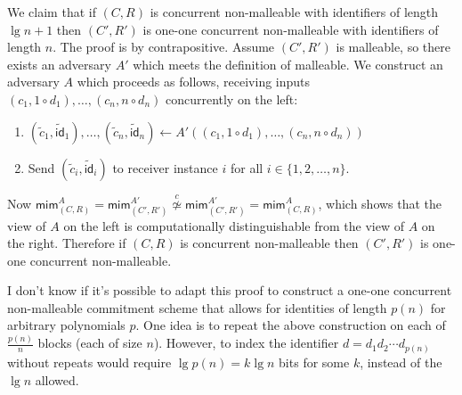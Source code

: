 \documentclass[draft]{article}
\newcommand{\ncid}{\overset{c}{\not\simeq}}
\newcommand{\mim}{\mathsf{mim}}
\begin{document}
\begin{enumerate}
  We claim that if $(C, R)$ is concurrent non-malleable with identifiers of length $\lg n + 1$ then $(C', R')$ is one-one concurrent non-malleable with identifiers of length $n$.
  The proof is by contrapositive.
  Assume $(C', R')$ is malleable, so there exists an adversary $A'$ which meets the definition of malleable.
  We construct an adversary $A$ which proceeds as follows, receiving inputs $(c_1, 1\circ d_1), \ldots, (c_n, n\circ d_n)$ concurrently on the left:
  \begin{enumerate}
  \item $(\tilde{c}_1, \tilde{\mathsf{id}}_1), \ldots, (\tilde{c}_n, \tilde{\mathsf{id}}_n) \gets A'((c_1, 1\circ d_1), \ldots, (c_n, n\circ d_n))$
  \item Send $(\tilde{c}_i, \tilde{\mathsf{id}}_i)$ to receiver instance $i$ for all $i\in\{1,2,\ldots, n\}$.
  \end{enumerate}
  Now $\mim^{A}_{(C, R)}=\mim^{A'}_{(C', R')}\ncid\mim^{A'}_{(C', R')}=\mim^{A}_{(C, R)}$, which shows that the view of $A$ on the left is computationally distinguishable from the view of $A$ on the right.
  Therefore if $(C, R)$ is concurrent non-malleable then $(C', R')$ is one-one concurrent non-malleable.

  I don't know if it's possible to adapt this proof to construct a one-one concurrent non-malleable commitment scheme that allows for identities of length $p(n)$ for arbitrary polynomials $p$.
  One idea is to repeat the above construction on each of $\frac{p(n)}{n}$ blocks (each of size $n$).
  However, to index the identifier $d=d_1d_2\cdots d_{p(n)}$ without repeats would require $\lg p(n)=k\lg n$ bits for some $k$, instead of the $\lg n$ allowed.
\end{enumerate}


\end{document}
